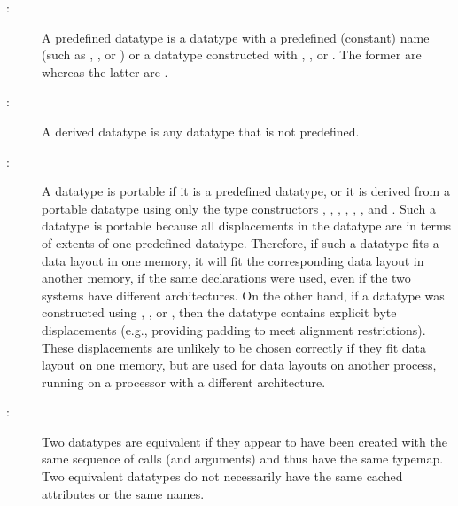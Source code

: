 \begin{description}
\item[:]
A predefined datatype is a datatype with a predefined (constant) name
(such as , , or )
or a datatype constructed with ,
, or
.  The former are 
whereas the latter are .
\item[:]
A derived datatype is any datatype that is not predefined.
\item[:]
A datatype is portable if it is a predefined datatype, or it is derived
from a portable datatype using only the type constructors
, ,
, \flushline %
,
, , and
.
Such a datatype is portable because all displacements in the datatype
are in terms of extents of one predefined datatype.  Therefore, if such a
datatype fits a data layout in one memory, it will fit the
corresponding data layout in another memory, if the same declarations
were used, even if the two systems have different architectures.  On
the other hand, if a datatype was constructed using
,
,
 or
, then the datatype contains explicit byte
displacements (e.g., providing padding to meet alignment restrictions).
These displacements are unlikely to be chosen correctly if they fit
data layout on one memory, but are used for data layouts on another
process, running on a processor with a different architecture.
\item[:]
Two datatypes are equivalent if they appear to have been created with
the same sequence of calls (and arguments) and thus have the same
typemap.  Two equivalent datatypes do not necessarily have the same
cached attributes or the same names.
\end{description}

